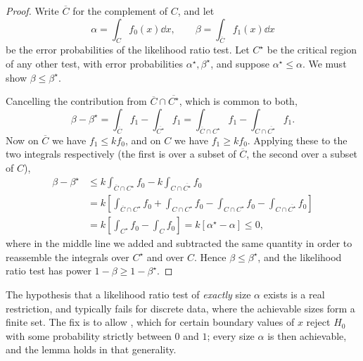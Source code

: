 \begin{proof}
  Write $\overline{C}$ for the complement of $C$, and let
  $$
  \alpha = \int_C f_0(x)\dd x, \qquad \beta = \int_{\overline{C}}f_1(x)\dd x
  $$
  be the error probabilities of the likelihood ratio test. Let $C^\star$ be the critical region of any other test, with error probabilities $\alpha^\star, \beta^\star$, and suppose $\alpha^\star \leq \alpha$. We must show $\beta \leq \beta^\star$.

  Cancelling the contribution from $\overline{C}\cap\overline{C^\star}$, which is common to both,
  $$
  \beta - \beta^\star = \int_{\overline{C}}f_1 - \int_{\overline{C^\star}}f_1 = \int_{\overline{C}\cap C^\star}f_1 - \int_{C \cap \overline{C^\star}}f_1.
  $$
  Now on $\overline{C}$ we have $f_1 \leq k f_0$, and on $C$ we have $f_1 \geq k f_0$. Applying these to the two integrals respectively (the first is over a subset of $\overline C$, the second over a subset of $C$),
  \begin{align*}
    \beta - \beta^\star &\leq k\int_{\overline{C}\cap C^\star}f_0 - k\int_{C\cap\overline{C^\star}}f_0\\
    &= k\left[\int_{\overline{C}\cap C^\star}f_0 + \int_{C\cap C^\star}f_0 - \int_{C \cap C^\star}f_0 - \int_{C\cap \overline{C^\star}}f_0\right]\\
    &= k\left[\int_{C^\star}f_0 - \int_C f_0\right] = k\left[\alpha^\star - \alpha\right] \leq 0,
  \end{align*}
  where in the middle line we added and subtracted the same quantity in order to reassemble the integrals over $C^\star$ and over $C$. Hence $\beta \leq \beta^\star$, and the likelihood ratio test has power $1 - \beta \geq 1 - \beta^\star$.
\end{proof}

\begin{remark}
  The hypothesis that a likelihood ratio test of \emph{exactly} size $\alpha$ exists is a real restriction, and typically fails for discrete data, where the achievable sizes form a finite set. The fix is to allow , which for certain boundary values of $x$ reject $H_0$ with some probability strictly between $0$ and $1$; every size $\alpha$ is then achievable, and the lemma holds in that generality.
\end{remark}

